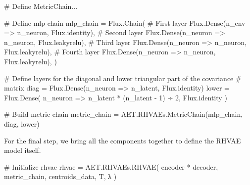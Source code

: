 \documentclass[
]{scrartcl}
\newenvironment{Shaded}{\begin{snugshade}}{\end{snugshade}}
\newcommand{\CommentTok}[1]{\textcolor[rgb]{0.37,0.37,0.37}{#1}}
\newcommand{\FloatTok}[1]{\textcolor[rgb]{0.68,0.00,0.00}{#1}}
\newcommand{\FunctionTok}[1]{\textcolor[rgb]{0.28,0.35,0.67}{#1}}
\newcommand{\NormalTok}[1]{\textcolor[rgb]{0.00,0.23,0.31}{#1}}
\newcommand{\OperatorTok}[1]{\textcolor[rgb]{0.37,0.37,0.37}{#1}}
\begin{document}
\begin{Shaded}
\begin{Highlighting}[]
\CommentTok{\# Define MetricChain...}

\CommentTok{\# Define mlp chain}
\NormalTok{mlp\_chain }\OperatorTok{=}\NormalTok{ Flux.}\FunctionTok{Chain}\NormalTok{(}
    \CommentTok{\# First layer}
\NormalTok{    Flux.}\FunctionTok{Dense}\NormalTok{(n\_env }\OperatorTok{=\textgreater{}}\NormalTok{ n\_neuron, Flux.identity),}
    \CommentTok{\# Second layer}
\NormalTok{    Flux.}\FunctionTok{Dense}\NormalTok{(n\_neuron }\OperatorTok{=\textgreater{}}\NormalTok{ n\_neuron, Flux.leakyrelu),}
    \CommentTok{\# Third layer}
\NormalTok{    Flux.}\FunctionTok{Dense}\NormalTok{(n\_neuron }\OperatorTok{=\textgreater{}}\NormalTok{ n\_neuron, Flux.leakyrelu),}
    \CommentTok{\# Fourth layer}
\NormalTok{    Flux.}\FunctionTok{Dense}\NormalTok{(n\_neuron }\OperatorTok{=\textgreater{}}\NormalTok{ n\_neuron, Flux.leakyrelu),}
\NormalTok{)}

\CommentTok{\# Define layers for the diagonal and lower triangular part of the covariance}
\CommentTok{\# matrix}
\NormalTok{diag }\OperatorTok{=}\NormalTok{ Flux.}\FunctionTok{Dense}\NormalTok{(n\_neuron }\OperatorTok{=\textgreater{}}\NormalTok{ n\_latent, Flux.identity)}
\NormalTok{lower }\OperatorTok{=}\NormalTok{ Flux.}\FunctionTok{Dense}\NormalTok{(}
\NormalTok{    n\_neuron }\OperatorTok{=\textgreater{}}\NormalTok{ n\_latent }\OperatorTok{*}\NormalTok{ (n\_latent }\OperatorTok{{-}} \FloatTok{1}\NormalTok{) }\OperatorTok{÷} \FloatTok{2}\NormalTok{, Flux.identity}
\NormalTok{)}

\CommentTok{\# Build metric chain}
\NormalTok{metric\_chain }\OperatorTok{=}\NormalTok{ AET.RHVAEs.}\FunctionTok{MetricChain}\NormalTok{(mlp\_chain, diag, lower)}
\end{Highlighting}
\end{Shaded}

For the final step, we bring all the components together to define the
RHVAE model itself.

\begin{Shaded}
\begin{Highlighting}[]
\CommentTok{\# Initialize rhvae}
\NormalTok{rhvae }\OperatorTok{=}\NormalTok{ AET.RHVAEs.}\FunctionTok{RHVAE}\NormalTok{(}
\NormalTok{    encoder }\OperatorTok{*}\NormalTok{ decoder,}
\NormalTok{    metric\_chain,}
\NormalTok{    centroids\_data,}
\NormalTok{    T,}
\NormalTok{    λ}
\NormalTok{)}
\end{Highlighting}
\end{Shaded}
\end{document}
